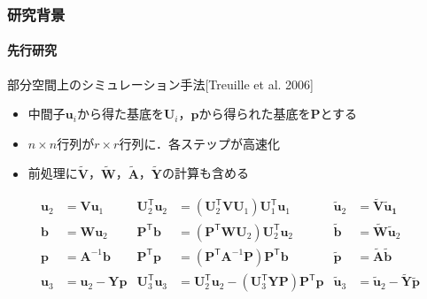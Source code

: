 \documentclass[aspectratio=169,dvipdfmx,hyperref={bookmarks=true}]{beamer}
\begin{document}
\begin{frame}
\frametitle{研究背景}
\framesubtitle{先行研究}
	\begin{block}{部分空間上のシミュレーション手法[Treuille et al. 2006]}
	   \begin{itemize}
   	\item 中間子$\bm{u}_i$から得た基底を$\bm{U}_i$，$\bm{p}$から得られた基底を$\bm{P}$とする
	\item $n\times n$行列が$r \times r$行列に．各ステップが高速化
	\item 前処理に$\bm{\widetilde{V}}$，$\bm{\widetilde{W}}$，$\bm{\widetilde{A}}$，$\bm{\widetilde{Y}}$の計算も含める
	\end{itemize}
\begin{align*}
 \bm{u}_2   		&=  \bm{V}\bm{u}_1&\bm{U}_2^{\mathsf T}\bm{u}_2	& = (\bm{U}_2^{\mathsf T}\bm{V}\bm{U}_1)\bm{U}_1^{\mathsf T}\bm{u}_1 					&\bm{\widetilde{u}}_2 		&= \bm{\widetilde{V}}\bm{\widetilde{u}_1}	\\
 \bm{b} 			&= \bm{W}\bm{u}_2&\bm{P}^{\mathsf T}\bm{b}		& = (\bm{P}^{\mathsf T}\bm{W}\bm{U}_2)\bm{U}_2^{\mathsf T}\bm{u}_2        				&\bm{\widetilde{b}}			&= \bm{\widetilde{W}}\bm{\widetilde{u}}_2	\\
 \bm{p} 			&= \bm{A}^{-1}\bm{b}&\bm{P}^{\mathsf T}\bm{p} 		&= (\bm{P}^{\mathsf T}\bm{A}^{-1}\bm{P})\bm{P}^{\mathsf T}\bm{b}						&\bm{\widetilde{p}}			&= \bm{\widetilde{A}}\bm{\widetilde{b}}\\
\bm{u}_3  			&= \bm{u}_2 - \bm{Y}\bm{p} &\bm{U}_3^{\mathsf T}\bm{u}_3 	&=  \bm{U}_2^{\mathsf T}\bm{u}_2 - (\bm{U}_3^{\mathsf T}\bm{Y}\bm{P})\bm{P}^{\mathsf T}\bm{p}	&\bm{\widetilde{u}}_3		&= \bm{\widetilde{u}}_2  -  \bm{\widetilde{Y}}\bm{\widetilde{p}}
\end{align*}
\end{block}
\end{frame}

\end{document}
